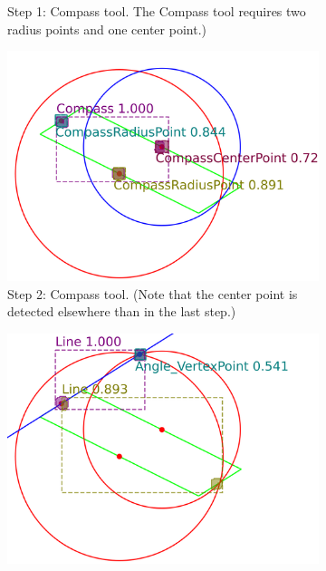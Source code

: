 \begin{figure}[htb!]
\begin{subfigure}[t]{0.32\textwidth}
         \caption{\small Step 1: Compass tool.  
         The Compass tool requires two radius points and one center point.)
         }
         \label{fig:Zeta06_example_step1}
     \end{subfigure}
     \hfill
     \begin{subfigure}[t]{0.32\textwidth}
         \centering
         \includegraphics[width=\textwidth]{img/Zeta-06_example/output_image1.png}
         \caption{\small Step 2: Compass tool. 
         (Note that the center point is detected elsewhere than in the last step.)
         }
         \label{fig:Zeta06_example_step2}
     \end{subfigure}
     \hfill
     \begin{subfigure}[t]{0.32\textwidth}
         \centering
         \includegraphics[width=\textwidth]{img/Zeta-06_example/output_image2.png}

\end{subfigure}
\end{figure}
